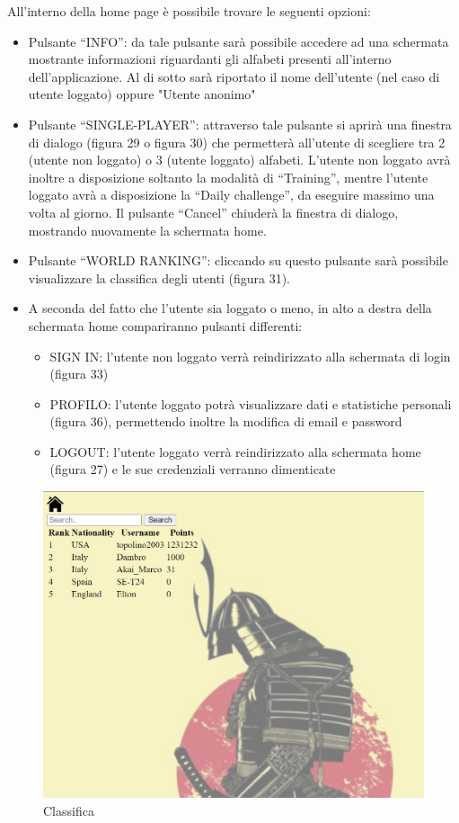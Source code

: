 All’interno della home page è possibile trovare le seguenti opzioni:
\begin{itemize}
    \item Pulsante “INFO”: da tale pulsante sarà possibile accedere ad una schermata mostrante informazioni riguardanti gli alfabeti presenti all’interno dell’applicazione. Al di sotto sarà riportato il nome dell'utente (nel caso di utente loggato) oppure "Utente anonimo"
    \item Pulsante “SINGLE-PLAYER”: attraverso tale pulsante si aprirà una finestra di dialogo (figura 29 o figura 30) che permetterà all’utente di scegliere tra 2 (utente non loggato) o 3 (utente loggato) alfabeti. L’utente non loggato avrà inoltre a disposizione soltanto la modalità di “Training”, mentre l’utente loggato avrà a disposizione la “Daily challenge”, da eseguire massimo una volta al giorno.
    Il pulsante “Cancel” chiuderà la finestra di dialogo, mostrando nuovamente la schermata home.
    \item Pulsante “WORLD RANKING”: cliccando su questo pulsante sarà possibile visualizzare la classifica degli utenti (figura 31).
    \item A seconda del fatto che l’utente sia loggato o meno, in alto a destra della schermata home compariranno pulsanti differenti:
    \begin{itemize}
        \item SIGN IN: l’utente non loggato verrà reindirizzato alla schermata di login (figura 33)
        \item PROFILO: l’utente loggato potrà visualizzare dati e statistiche personali (figura 36), permettendo inoltre la modifica di email e password
        \item LOGOUT: l’utente loggato verrà reindirizzato alla schermata home (figura 27) e le sue credenziali verranno dimenticate
    \end{itemize}
\end{itemize}


\begin{figure}[!h]
\centering
\includegraphics[scale=0.70]{images/classifica.png}
\caption{Classifica}
\label{fig:user_flow_guest}
\end{figure}
\noindent



